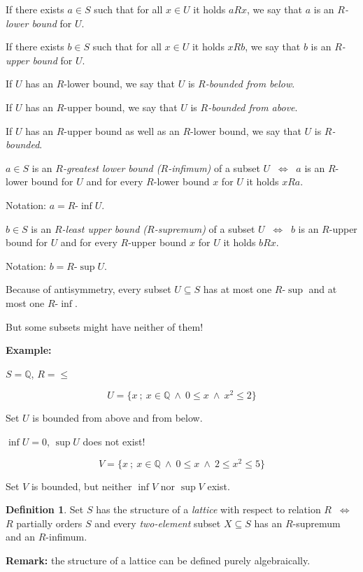 \documentclass[11pt,paper=b5,footinclude,headinclude]{scrbook} %
\def\inn {{~\wedge~}}
\def\cee {{~\Leftrightarrow~}}
\theoremstyle{remark}
\theoremstyle{definition} %
\newtheorem*{definition}{Definition}
\theoremstyle{theorem} %
\begin{document}
If there exists $a\in S$ such that for all $x\in U$ it holds $aRx$, we say that
$a$ is an {\em $R$-lower bound} for $U$.

\bigskip
If there exists $b\in S$ such that for all $x\in U$ it holds $xRb$, we say that
$b$ is an {\em $R$-upper bound} for $U$.

\bigskip
If $U$ has an $R$-lower bound, we say that $U$ is {\em $R$-bounded from below}.

\bigskip
If $U$ has an $R$-upper bound, we say that $U$ is {\em $R$-bounded from above}.

\bigskip
If $U$ has an $R$-upper bound as well as an $R$-lower bound, we say that
$U$ is {\em $R$-bounded}.

\bigskip
$a\in S$ is an {\em $R$-greatest lower bound ($R$-infimum)} of a subset $U$
$\cee$ $a$ is an $R$-lower bound for $U$ and for every $R$-lower bound $x$ for $U$ it holds $xRa$.

Notation: $a = R$-$\inf U$.

\bigskip
$b\in S$ is an {\em $R$-least upper bound ($R$-supremum)} of a subset $U$
$\cee$ $b$ is an $R$-upper bound for $U$ and for every $R$-upper bound $x$ for $U$ it holds $bRx$.

Notation: $b = R$-$\sup U$.

\bigskip
Because of antisymmetry, every subset $U\subseteq S$ has at most one $R$-$\sup$
and at most one $R$-$\inf$.

But some subsets might have neither of them!

\bigskip
\textbf{ Example:}

$S = \mathbb{Q}$, $R = \le$

$$U = \{x~;~x\in \mathbb{Q}\inn 0\le x \inn x^2\le 2\}$$

Set $U$ is bounded from above and from below.

$\inf U = 0$, $\sup U$ does not exist!

\medskip
$$V = \{x~;~x\in \mathbb{Q}\inn 0\le x \inn 2\le x^2\le 5\}$$

Set $V$ is bounded, but neither $\inf V$ nor $\sup V$ exist.

\begin{definition}
Set $S$ has the structure of a {\em lattice} with respect to relation $R$ $\cee$
$R$ partially orders $S$ and every {\em two-element} subset $X\subseteq S$
has an $R$-supremum and an $R$-infimum.
\end{definition}

\textbf{Remark:} the structure of a lattice can be defined purely algebraically.
\end{document}
